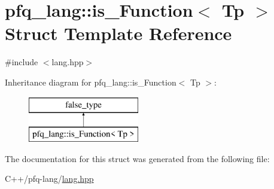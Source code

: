 \hypertarget{structpfq__lang_1_1is__Function}{\section{pfq\+\_\+lang\+:\+:is\+\_\+\+Function$<$ Tp $>$ Struct Template Reference}
\label{structpfq__lang_1_1is__Function}
}


{\ttfamily \#include $<$lang.\+hpp$>$}

Inheritance diagram for pfq\+\_\+lang\+:\+:is\+\_\+\+Function$<$ Tp $>$\+:\begin{figure}[H]
\begin{center}
\leavevmode
\includegraphics[height=2.000000cm]{structpfq__lang_1_1is__Function}
\end{center}
\end{figure}


The documentation for this struct was generated from the following file\+:\begin{DoxyCompactItemize}
\item 
C++/pfq-\/lang/\hyperlink{lang_8hpp}{lang.\+hpp}\end{DoxyCompactItemize}

